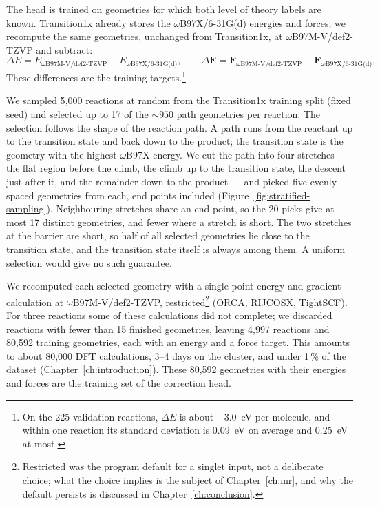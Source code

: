 The head is trained on geometries for which both level of theory labels are known.
Transition1x already stores the $\omega$B97X/6-31G(d) energies and forces;
we recompute the same geometries, unchanged from Transition1x, at
$\omega$B97M-V/def2-TZVP and subtract:
\begin{equation}
  \Delta E = E_{\omega\text{B97M-V/def2-TZVP}} - E_{\omega\text{B97X/6-31G(d)}},
  \qquad
  \Delta \mathbf{F} = \mathbf{F}_{\omega\text{B97M-V/def2-TZVP}} - \mathbf{F}_{\omega\text{B97X/6-31G(d)}}.
\end{equation}
These differences are the training targets.\footnote{On the 225
validation reactions, $\Delta E$ is about $-3.0$~eV per molecule, and
within one reaction its standard deviation is 0.09~eV on average and
0.25~eV at most.}

We sampled 5{,}000 reactions at random from the Transition1x training split
(fixed seed) and selected up to 17 of the ${\sim}950$ path geometries per reaction.
The selection follows the shape of the reaction path. A path runs from the
reactant up to the transition state and back down to the product; the
transition state is the geometry with the highest $\omega$B97X energy. We
cut the path into four stretches --- the flat region before the climb, the
climb up to the transition state, the descent just after it, and the
remainder down to the product --- and picked five evenly spaced geometries
from each, end points included (Figure~\ref{fig:stratified-sampling}).
Neighbouring stretches share an end point, so the 20 picks give at most
17 distinct geometries, and fewer where a stretch is short. The two stretches at the
barrier are short, so half of all selected geometries lie close to the
transition state, and the transition state itself is always among them. A
uniform selection would give no such guarantee.

We recomputed each selected geometry with a single-point
energy-and-gradient calculation at $\omega$B97M-V/def2-TZVP,
restricted\footnote{Restricted was the program default for a singlet
input, not a deliberate choice; what the choice implies is the subject
of Chapter~\ref{ch:mr}, and why the default persists is discussed in
Chapter~\ref{ch:conclusion}.} (ORCA, RIJCOSX, TightSCF). For three reactions some of these calculations did not complete; we
discarded reactions with fewer than 15 finished geometries, leaving 4{,}997
reactions and 80{,}592 training geometries, each with an energy and a force
target. This amounts to about 80{,}000 DFT calculations, 3--4 days on the
cluster, and under 1\,\% of the dataset (Chapter~\ref{ch:introduction}).
These 80{,}592 geometries with their energies and forces are the
training set of the correction head.


